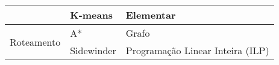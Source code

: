 \begin{table}[h!b]
{\begin{tabular}{@{}lll@{}}
                                                                                       & K-means                        & Elementar                        \\ \midrule
\multirow{2}{*}{Roteamento}                                                            & A*                             & Grafo                            \\
                                                                                       & Sidewinder                     & Programação Linear Inteira (ILP) \\ \bottomrule
\end{tabular}%
}
\end{table}

